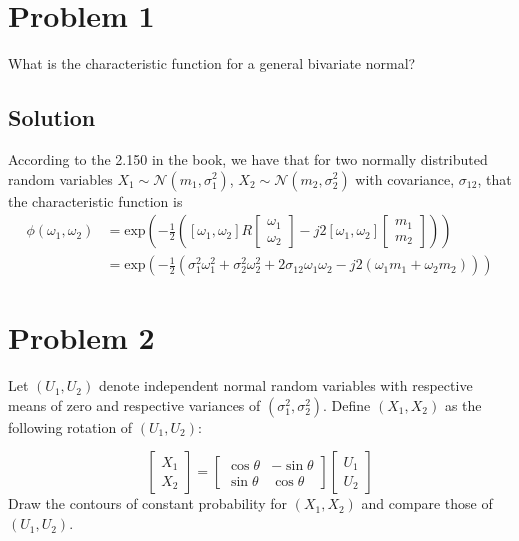 \documentclass[a4paper]{article}
\begin{document}
\section*{Problem 1}%
What is the characteristic function for a general bivariate normal?

\subsection*{Solution}%
According to the 2.150 in the book, we have that for two normally distributed random variables $X_1 \sim \mathcal{N}(m_1, \sigma_1^2)$, $X_2 \sim \mathcal{N}(m_2, \sigma_2^2)$ with covariance, $\sigma_{12}$, that the characteristic function is
\[
  \begin{aligned}
    \phi(\omega_1, \omega_2) &= \text{exp} \left( -\frac{1}{2}\left( [\omega_1, \omega_2]R \begin{bmatrix}
      \omega_1 \\
      \omega_2
\end{bmatrix} -j2[\omega_1, \omega_2]
  \begin{bmatrix}
    m_1 \\
    m_2
  \end{bmatrix}\right)\right) \\
                             &=  \text{exp} \left( -\frac{1}{2}\left( \sigma_1^2\omega_1^2 + \sigma_2^2\omega_2^2 + 2\sigma_{12}\omega_1\omega_2 - j2(\omega_1m_1 + \omega_2m_2) \right)  \right)
  \end{aligned}
\]

\section*{Problem 2}%
Let $(U_1, U_2)$ denote independent normal random variables with respective means of zero and respective variances of $(\sigma_1^2, \sigma_2^2)$. Define $(X_1, X_2)$ as the following rotation of $(U_1,U_2)$:

\[
  \begin{bmatrix}
    X_1 \\
    X_2
  \end{bmatrix}
  = 
  \begin{bmatrix}
    \cos \theta & -\sin \theta \\
    \sin \theta & \cos \theta
  \end{bmatrix}
  \begin{bmatrix}
    U_1 \\
    U_2
  \end{bmatrix}
\]
Draw the contours of constant probability for $(X_1, X_2)$ and compare those of $(U_1, U_2)$.
\end{document}
